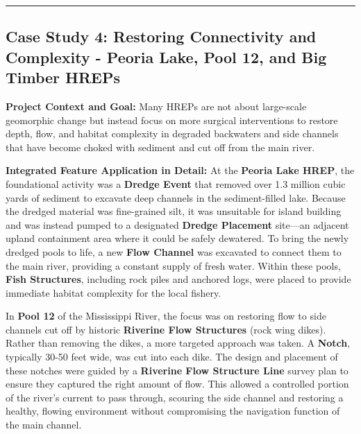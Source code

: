 \documentclass[
  letterpaper,
  DIV=11,
  numbers=noendperiod]{scrreprt}
\begin{document}
\begin{center}\rule{0.5\linewidth}{0.5pt}\end{center}

\subsection{\texorpdfstring{\textbf{Case Study 4: Restoring Connectivity
and Complexity - Peoria Lake, Pool 12, and Big Timber
HREPs}}{Case Study 4: Restoring Connectivity and Complexity - Peoria Lake, Pool 12, and Big Timber HREPs}}\label{case-study-4-restoring-connectivity-and-complexity---peoria-lake-pool-12-and-big-timber-hreps}

\textbf{Project Context and Goal:} Many HREPs are not about large-scale
geomorphic change but instead focus on more surgical interventions to
restore depth, flow, and habitat complexity in degraded backwaters and
side channels that have become choked with sediment and cut off from the
main river.

\textbf{Integrated Feature Application in Detail:} At the \textbf{Peoria
Lake HREP}, the foundational activity was a \textbf{Dredge Event} that
removed over 1.3 million cubic yards of sediment to excavate deep
channels in the sediment-filled lake. Because the dredged material was
fine-grained silt, it was unsuitable for island building and was instead
pumped to a designated \textbf{Dredge Placement} site---an adjacent
upland containment area where it could be safely dewatered. To bring the
newly dredged pools to life, a new \textbf{Flow Channel} was excavated
to connect them to the main river, providing a constant supply of fresh
water. Within these pools, \textbf{Fish Structures}, including rock
piles and anchored logs, were placed to provide immediate habitat
complexity for the local fishery.

In \textbf{Pool 12} of the Mississippi River, the focus was on restoring
flow to side channels cut off by historic \textbf{Riverine Flow
Structures} (rock wing dikes). Rather than removing the dikes, a more
targeted approach was taken. A \textbf{Notch}, typically 30-50 feet
wide, was cut into each dike. The design and placement of these notches
were guided by a \textbf{Riverine Flow Structure Line} survey plan to
ensure they captured the right amount of flow. This allowed a controlled
portion of the river's current to pass through, scouring the side
channel and restoring a healthy, flowing environment without
compromising the navigation function of the main channel.
\end{document}

